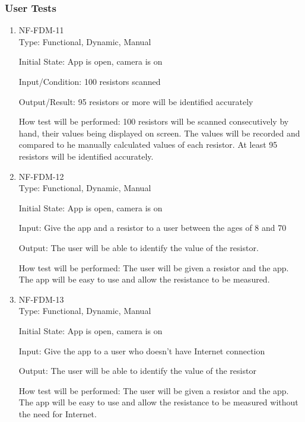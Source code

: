 \documentclass[12pt, titlepage]{article}
\begin{document}
\subsubsection{User Tests}
\begin{enumerate}
\item{NF-FDM-11\\}
Type: Functional, Dynamic, Manual
					
Initial State: 
App is open, camera is on
					
Input/Condition: 
100 resistors scanned
					
Output/Result: 
95 resistors or more will be identified accurately
					
How test will be performed: 
100 resistors will be scanned consecutively by hand, their values being displayed on screen. The values will be recorded and compared to he manually calculated values of each resistor. At least 95 resistors will be identified accurately.
					
\item{NF-FDM-12\\}
Type: Functional, Dynamic, Manual
					
Initial State: 
App is open, camera is on
					
Input: 
Give the app and a resistor to a user between the ages of 8 and 70
					
Output: 
The user will be able to identify the value of the resistor.
					
How test will be performed: 
The user will be given a resistor and the app. The app will be easy to use and allow the resistance to be measured.

\item{NF-FDM-13\\}
Type: Functional, Dynamic, Manual
					
Initial State: 
App is open, camera is on
					
Input: 
Give the app to a user who doesn't have Internet connection
					
Output: 
The user will be able to identify the value of the resistor
					
How test will be performed: 
The user will be given a resistor and the app. The app will be easy to use and allow the resistance to be measured without the need for Internet.

\end{enumerate}
\end{document}
